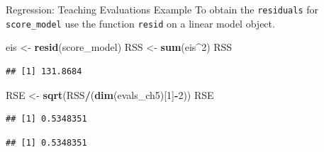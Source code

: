 \documentclass[
  ignorenonframetext,
]{beamer}
\newenvironment{Shaded}{\begin{snugshade}}{\end{snugshade}}
\newcommand{\CommentTok}[1]{\textcolor[rgb]{0.56,0.35,0.01}{\textit{#1}}}
\newcommand{\DecValTok}[1]{\textcolor[rgb]{0.00,0.00,0.81}{#1}}
\newcommand{\FunctionTok}[1]{\textcolor[rgb]{0.13,0.29,0.53}{\textbf{#1}}}
\newcommand{\NormalTok}[1]{#1}
\newcommand{\OtherTok}[1]{\textcolor[rgb]{0.56,0.35,0.01}{#1}}
\newcommand{\SpecialCharTok}[1]{\textcolor[rgb]{0.81,0.36,0.00}{\textbf{#1}}}
\begin{document}
\begin{frame}[fragile]{Regression: Teaching Evaluations Example}
\protect\hypertarget{regression-teaching-evaluations-example-6}{}
To obtain the \texttt{residuals} for \texttt{score\_model} use the
function \texttt{resid} on a linear model object. \tiny

\begin{Shaded}
\begin{Highlighting}[]
\NormalTok{eis }\OtherTok{\textless{}{-}} \FunctionTok{resid}\NormalTok{(score\_model)}
\NormalTok{RSS }\OtherTok{\textless{}{-}} \FunctionTok{sum}\NormalTok{(eis}\SpecialCharTok{\^{}}\DecValTok{2}\NormalTok{)}
\NormalTok{RSS}
\end{Highlighting}
\end{Shaded}

\begin{verbatim}
## [1] 131.8684
\end{verbatim}

\begin{Shaded}
\begin{Highlighting}[]
\NormalTok{RSE }\OtherTok{\textless{}{-}} \FunctionTok{sqrt}\NormalTok{(RSS}\SpecialCharTok{/}\NormalTok{(}\FunctionTok{dim}\NormalTok{(evals\_ch5)[}\DecValTok{1}\NormalTok{]}\SpecialCharTok{{-}}\DecValTok{2}\NormalTok{))}
\NormalTok{RSE}
\end{Highlighting}
\end{Shaded}

\begin{verbatim}
## [1] 0.5348351
\end{verbatim}

\begin{Shaded}
\end{Shaded}

\begin{verbatim}
## [1] 0.5348351
\end{verbatim}

\normalsize
\end{frame}
\end{document}
